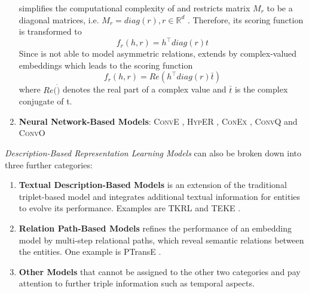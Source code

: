 \begin{enumerate}
    
    \distmult \cite{DistMult} simplifies the computational complexity of \rescal and restricts matrix $M_r$ to be a diagonal matrices, i.e. $M_r = diag(r), r \in \mathbb{R}^d$ \cite{electronics9050750}. 
    Therefore, its scoring function is transformed to
    \begin{equation}
        f_r(h,r) = h^{\top}diag(r)t\label{eq:distmultscoringfunction}
    \end{equation}
    Since \distmult is not able to model asymmetric relations, \complex \cite{ComplEx} extends \distmult by complex-valued embeddings \cite{electronics9050750} which leads to the scoring function
    \begin{equation}
        f_r(h,r) = Re(h^{\top}diag(r)\bar{t})
        \label{eq:complexscoringfunction}
    \end{equation}
    where $Re(\dot)$ denotes the real part of a complex value and $\bar{t}$ is the complex conjugate of t.
    
    
    \item 
    \textbf{Neural Network-Based Models}: 
    \textsc{ConvE} \cite{ConvE}, \textsc{HypER} \cite{HypER}, \textsc{ConEx} \cite{ConEx}, \textsc{ConvQ} and  \textsc{ConvO} \cite{demir2021convolutional}
\end{enumerate}
\textit{Description-Based Representation Learning Models} can also be broken down into three further categories:
\begin{enumerate}
    \item 
    \textbf{Textual Description-Based Models} is an extension of the traditional triplet-based model and integrates additional textual information for entities to evolve its performance.
    Examples are \ac{TKRL} \cite{TKRL} and \ac{TEKE} \cite{TEKE}.
    
    \item 
    \textbf{Relation Path-Based Models} refines the performance of an embedding model by multi-step relational paths, which reveal semantic relations between the entities.
    One example is \ac{PTransE} \cite{PTransE}.
    
     \item 
    \textbf{Other Models} that cannot be assigned to the other two categories and pay attention to further triple information such as temporal aspects.
\end{enumerate}






